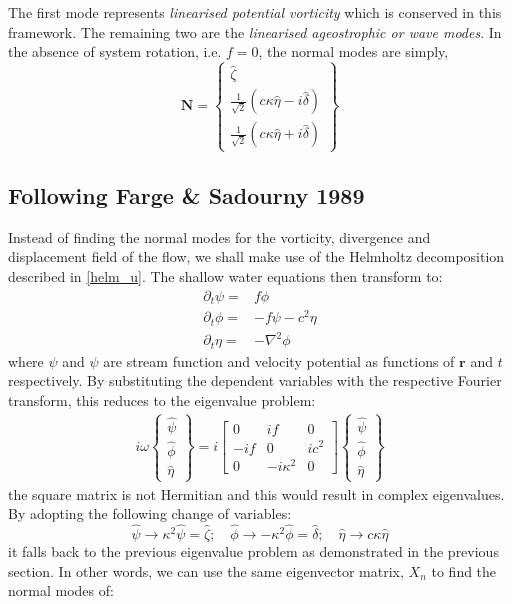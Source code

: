\documentclass[a4paper,12pt]{paper}
\begin{document}
The first mode represents \emph{linearised potential vorticity} which is 
conserved in this framework. The remaining two are the \emph{linearised 
ageostrophic or wave modes}. In the absence of system rotation, i.e. $f=0$, 
the normal modes are simply,
\begin{equation}
\label{nmode}
 \mathbf{N} = 
 \begin{Bmatrix}
  \hat \zeta \\
  \frac{1}{\sqrt{2}} (c\kappa \hat{\eta} - i\hat{\delta})\\
  \frac{1}{\sqrt{2}} (c\kappa \hat{\eta} + i\hat{\delta})
 \end{Bmatrix}
\end{equation}

\subsection{Following Farge \& Sadourny 1989}
Instead of finding the normal modes for the vorticity, divergence and 
displacement field of the flow, we shall make use of the Helmholtz 
decomposition described in \eqref{helm_u}. The shallow water equations then 
transform to:
 \begin{align}
    \partial_t \psi =&  f \phi
  \label{dtpsi_l} \\ 
    \partial_t \phi =&  -f \psi - c^2 \eta \label{dtphi_l} \\
    \partial_t \eta =& - \nabla^2 \phi \label{dteta_l2}
  \end{align}
where $\psi$ and $\psi$ are stream function and velocity potential as functions 
of $\mathbf{r}$ and $t$ respectively. By substituting the dependent 
variables with the respective Fourier transform, this reduces to the eigenvalue 
problem:
\begin{align}
 i\omega
   \begin{Bmatrix}
       \hat{\psi} \\ \hat{\phi} \\ \hat{\eta}
  \end{Bmatrix}
  = i
  \begin{bmatrix}
     0 & if & 0 \\
   -if &  0 & ic^2 \\
     0 & -i\kappa^2 & 0 
  \end{bmatrix}
  \begin{Bmatrix}
       \hat{\psi} \\ \hat{\phi} \\ \hat{\eta}
  \end{Bmatrix}
\end{align}
the square matrix is not Hermitian and this would result in complex 
eigenvalues. By adopting the following change of variables:
\begin{equation}
 \hat{\psi} \to \kappa^2\hat \psi = \hat{\zeta} ; \quad
 \hat{\phi} \to -\kappa^2\hat \phi = \hat{\delta}; \quad
 \hat{\eta} \to c\kappa\hat \eta
\end{equation}
it falls back to the previous eigenvalue problem as demonstrated in the  
previous section. In other words, we can use the same eigenvector matrix, $X_n$ 
to find the normal modes of:
\end{document}

